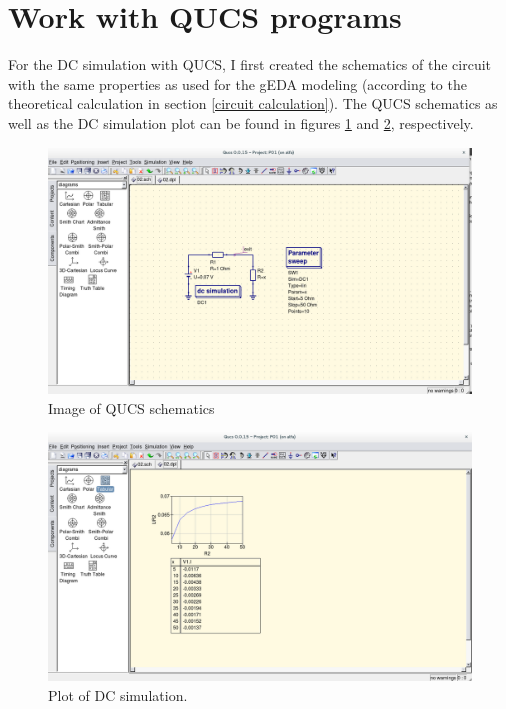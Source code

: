 \documentclass{report}
\begin{document}
\section{Work with QUCS programs}
For the DC simulation with QUCS, I first created the schematics of the circuit with the same properties as used for the gEDA modeling (according to the theoretical calculation in section \ref{circuit calculation}). The QUCS schematics as well as the DC simulation plot can be found in figures \ref{schematics} and \ref{sim}, respectively.
\begin{figure}[t]
    \centering
    \includegraphics[width=\textwidth]{P01QUCSschematics.png}
    \caption{Image of QUCS schematics}
    \label{schematics}
\end{figure}

\begin{figure}[t]
    \centering
    \includegraphics[width=\textwidth]{P01QUCSsimresults.png}
    \caption{Plot of DC simulation.}
    \label{sim}
\end{figure}
\end{document}
